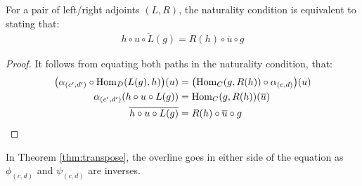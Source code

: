 \begin{theorem}
  For a pair of left/right adjoints $(L, R)$, the naturality condition is
  equivalent to stating that:
  \begin{align*}
    \overline{h\circ u \circ L(g)} = R(h) \circ \overline{u} \circ g
  \end{align*}

  \begin{proof}
    It follows from equating both paths in the naturality condition, that:
    \[
      \begin{aligned}
      \big(\alpha_{(c', d')} \circ \mathrm{Hom}_D(L(g), h)\big)(u)
        &= \big(\mathrm{Hom}_C(g, R(h)) \circ \alpha_{(c, d)}\big)(u)\\
      \alpha_{(c', d')}(h\circ u \circ L(g))
        &= \mathrm{Hom}_C(g, R(h))(\overline{u})\\
      \overline{h\circ u \circ L(g)}
        &= R(h) \circ \overline{u} \circ g
      \end{aligned}
    \]
  \end{proof}
\end{theorem}

\begin{remark}
  In Theorem \ref{thm:transpose}, the overline goes in either side of the
  equation as $\phi_{(c, d)}$ and $\psi_{(c, d)}$ are inverses.
\end{remark}

